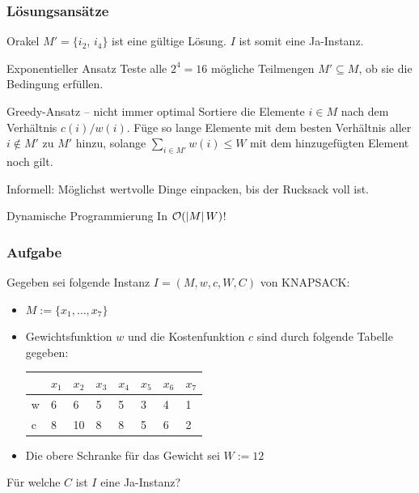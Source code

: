 \begin{frame}
\frametitle{Lösungsansätze}
\begin{block}{Orakel}
  $M' = \{i_2$, $i_4\}$ ist eine gültige Lösung. $I$ ist somit eine Ja-Instanz.
 \end{block}
\begin{block}{Exponentieller Ansatz}
 Teste alle $2^4 = 16$ mögliche Teilmengen $M' \subseteq M$, ob sie die Bedingung erfüllen. 
\end{block}
\begin{block}{Greedy-Ansatz -- nicht immer optimal}
 Sortiere die Elemente $i \in M$ nach dem Verhältnis $c(i)/w(i)$. 
 Füge so lange Elemente mit dem besten Verhältnis aller $i \not\in M'$ zu $M'$ hinzu, solange $\sum_{i \in M'} w(i) \leq W$ mit dem hinzugefügten Element noch gilt.
 
 Informell: Möglichst wertvolle Dinge einpacken, bis der Rucksack voll ist.
\end{block}
\invincible
\pause
\begin{block}{Dynamische Programmierung}
 In $\mathcal{O}(\left\vert M \right\vert W)$!
\end{block}
\vincible

\end{frame}





\begin{frame}
\frametitle{Aufgabe}
Gegeben sei folgende Instanz $I=(M, w, c, W, C)$ von KNAPSACK:

\begin{itemize}
\item $M := \{x_1, \ldots, x_7\}$
\item Gewichtsfunktion $w$ und die Kostenfunktion $c$ sind durch folgende Tabelle gegeben:

\begin{center}
\begin{tabular}{l|l|l|l|l|l|l|l}
	  &$x_1$ &$x_2$ &$x_3$ 	&$x_4$ 	&$x_5$ 	&$x_6$ 	&$x_7$\\ 	
  \hline
	w &6	 &6	&5	&5	&3	&4	&1\\
  \hline
	c &8	 &10	&8	&8	&5	&6	&2\\
\end{tabular}
\end{center}
\item Die obere Schranke für das Gewicht sei $W:=12$
\end{itemize}

Für welche $C$ ist $I$ eine Ja-Instanz?  
\end{frame}

